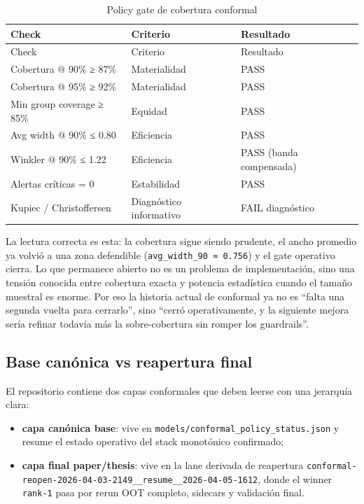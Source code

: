 \documentclass[
  spanish,
  11pt,
  letterpaper,
]{scrbook}
\providecommand{\tightlist}{%
  \setlength{\itemsep}{0pt}\setlength{\parskip}{0pt}}
\theoremstyle{plain}
\theoremstyle{remark}
\begin{document}
\begin{longtable}[]{@{}lll@{}}
\caption{Policy gate de cobertura
conformal}\label{tbl-policy-gate}\tabularnewline
\toprule\noalign{}
Check & Criterio & Resultado \\
\midrule\noalign{}
\endfirsthead
\toprule\noalign{}
Check & Criterio & Resultado \\
\midrule\noalign{}
\endhead
\bottomrule\noalign{}
\endlastfoot
Cobertura @ 90\% ≥ 87\% & Materialidad & PASS \\
Cobertura @ 95\% ≥ 92\% & Materialidad & PASS \\
Min group coverage ≥ 85\% & Equidad & PASS \\
Avg width @ 90\% ≤ 0.80 & Eficiencia & PASS \\
Winkler @ 90\% ≤ 1.22 & Eficiencia & PASS (banda compensada) \\
Alertas críticas = 0 & Estabilidad & PASS \\
Kupiec / Christoffersen & Diagnóstico informativo & FAIL diagnóstico \\
\end{longtable}

La lectura correcta es esta: la cobertura sigue siendo prudente, el
ancho promedio ya volvió a una zona defendible
(\texttt{avg\_width\_90\ ≈\ 0.756}) y el gate operativo cierra. Lo que
permanece abierto no es un problema de implementación, sino una tensión
conocida entre cobertura exacta y potencia estadística cuando el tamaño
muestral es enorme. Por eso la historia actual de conformal ya no es
``falta una segunda vuelta para cerrarlo'', sino ``cerró operativamente,
y la siguiente mejora sería refinar todavía más la sobre-cobertura sin
romper los guardrails''.

\subsection{Base canónica vs reapertura
final}\label{base-canuxf3nica-vs-reapertura-final}

El repositorio contiene dos capas conformales que deben leerse con una
jerarquía clara:

\begin{itemize}
\tightlist
\item
  \textbf{capa canónica base}: vive en
  \texttt{models/conformal\_policy\_status.json} y resume el estado
  operativo del stack monotónico confirmado;
\item
  \textbf{capa final paper/thesis}: vive en la lane derivada de
  reapertura
  \texttt{conformal-reopen-2026-04-03-2149\_\_resume\_\_2026-04-05-1612},
  donde el winner \texttt{rank-1} pasa por rerun OOT completo, sidecars
  y validación final.
\end{itemize}
\end{document}
